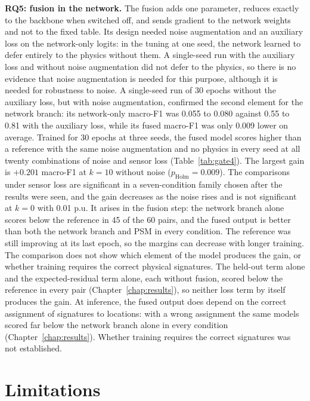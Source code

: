 \documentclass[MTech]{ugthesis}
\begin{document}
\textbf{RQ5: fusion in the network.} The fusion adds one parameter, reduces exactly to the backbone when switched off, and sends gradient to the network weights and not to the fixed table. Its design needed noise augmentation and an auxiliary loss on the network-only logits: in the tuning at one seed, the network learned to defer entirely to the physics without them. A single-seed run with the auxiliary loss and without noise augmentation did not defer to the physics, so there is no evidence that noise augmentation is needed for this purpose, although it is needed for robustness to noise. A single-seed run of 30 epochs without the auxiliary loss, but with noise augmentation, confirmed the second element for the network branch: its network-only macro-F1 was 0.055 to 0.080 against 0.55 to 0.81 with the auxiliary loss, while its fused macro-F1 was only 0.009 lower on average. Trained for 30 epochs at three seeds, the fused model scores higher than a reference with the same noise augmentation and no physics in every seed at all twenty combinations of noise and sensor loss (Table~\ref{tab:gate4}). The largest gain is $+0.201$ macro-F1 at $k=10$ without noise ($p_{\mathrm{Holm}}=0.009$). The comparisons under sensor loss are significant in a seven-condition family chosen after the results were seen, and the gain decreases as the noise rises and is not significant at $k=0$ with 0.01 p.u. It arises in the fusion step: the network branch alone scores below the reference in 45 of the 60 pairs, and the fused output is better than both the network branch and \ac{PSM} in every condition. The reference was still improving at its last epoch, so the margins can decrease with longer training. The comparison does not show which element of the model produces the gain, or whether training requires the correct physical signatures. The held-out term alone and the expected-residual term alone, each without fusion, scored below the reference in every pair (Chapter~\ref{chap:results}), so neither loss term by itself produces the gain. At inference, the fused output does depend on the correct assignment of signatures to locations: with a wrong assignment the same models scored far below the network branch alone in every condition (Chapter~\ref{chap:results}). Whether training requires the correct signatures was not established.

\section{Limitations}
\end{document}
